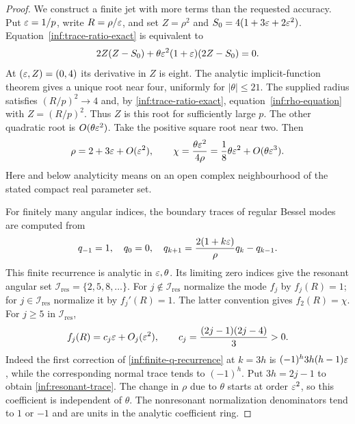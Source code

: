 \begin{proof}
We construct a finite jet with more terms than the requested accuracy.
Put $\varepsilon=1/p$, write $R=\rho/\varepsilon$, and set
$Z=\rho^2$ and $S_0=4(1+3\varepsilon+2\varepsilon^2)$.
Equation~\eqref{inf:trace-ratio-exact} is equivalent to
\begin{equation}\label{inf:rho-equation}
 2Z(Z-S_0)+\theta\varepsilon^2(1+\varepsilon)(2Z-S_0)=0.
\end{equation}
At $(\varepsilon,Z)=(0,4)$ its derivative in $Z$ is eight.
The analytic implicit-function theorem gives a unique root near four,
uniformly for $|\theta|\le21$. The supplied radius satisfies
$(R/p)^2\to4$ and, by \eqref{inf:trace-ratio-exact},
equation~\eqref{inf:rho-equation} with $Z=(R/p)^2$.
Thus $Z$ is this root for sufficiently large $p$. The other quadratic root is
$O(\theta\varepsilon^2)$. Take the positive square root near two.
Then
\begin{equation}\label{inf:chi-analytic}
 \rho=2+3\varepsilon+O(\varepsilon^2),\qquad
 \chi=\frac{\theta\varepsilon^2}{4\rho}
      =\frac18\theta\varepsilon^2+O(\theta\varepsilon^3).
\end{equation}
Here and below analyticity means on an open complex neighbourhood of
the stated compact real parameter set.

For finitely many angular indices, the boundary traces of regular
Bessel modes are computed from
\begin{equation}\label{inf:finite-q-recurrence}
 q_{-1}=1,\quad q_0=0,\quad
 q_{k+1}=\frac{2(1+k\varepsilon)}\rho q_k-q_{k-1}.
\end{equation}
This finite recurrence is analytic in $\varepsilon,\theta$.
Its limiting zero indices give the resonant angular set
$\mathcal I_{\mathrm{res}}=\{2,5,8,\ldots\}$.
For $j\notin\mathcal I_{\mathrm{res}}$ normalize the mode $f_j$ by $f_j(R)=1$;
for $j\in\mathcal I_{\mathrm{res}}$ normalize it by $f_j'(R)=1$.
The latter convention gives $f_2(R)=\chi$. For $j\ge5$ in
$\mathcal I_{\mathrm{res}}$,
\begin{equation}\label{inf:resonant-trace}
 f_j(R)=c_j\varepsilon+O_j(\varepsilon^2),\qquad
 c_j=\frac{(2j-1)(2j-4)}3>0.
\end{equation}
Indeed the first correction of \eqref{inf:finite-q-recurrence} at
$k=3h$ is $(-1)^h3h(h-1)\varepsilon$, while the corresponding normal
trace tends to $(-1)^h$. Put $3h=2j-1$ to obtain
\eqref{inf:resonant-trace}. The change in $\rho$ due to $\theta$
starts at order $\varepsilon^2$, so this coefficient is independent of
$\theta$. The nonresonant normalization denominators tend to $1$ or
$-1$ and are units in the analytic coefficient ring.


\end{proof}
